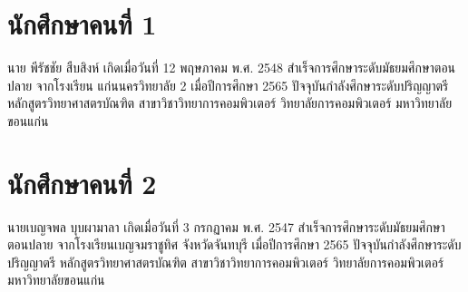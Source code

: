 %

\section*{นักศึกษาคนที่ 1}

นาย พีรัชชัย สืบสิงห์ เกิดเมื่อวันที่ 12 พฤษภาคม พ.ศ. 2548 
สำเร็จการศึกษาระดับมัธยมศึกษาตอนปลาย จากโรงเรียน แก่นนครวิทยาลัย 2 เมื่อปีการศึกษา 2565
ปัจจุบันกำลังศึกษาระดับปริญญาตรี หลักสูตรวิทยาศาสตรบัณฑิต
สาขาวิชาวิทยาการคอมพิวเตอร์ วิทยาลัยการคอมพิวเตอร์ มหาวิทยาลัยขอนแก่น


\section*{นักศึกษาคนที่ 2}

นายเบญจพล บุบผามาลา เกิดเมื่อวันที่ 3 กรกฏาคม พ.ศ. 2547
สำเร็จการศึกษาระดับมัธยมศึกษาตอนปลาย จากโรงเรียนเบญจมราชูทิศ จังหวัดจันทบุรี เมื่อปีการศึกษา 2565
ปัจจุบันกำลังศึกษาระดับปริญญาตรี หลักสูตรวิทยาศาสตรบัณฑิต
สาขาวิชาวิทยาการคอมพิวเตอร์ วิทยาลัยการคอมพิวเตอร์ มหาวิทยาลัยขอนแก่น